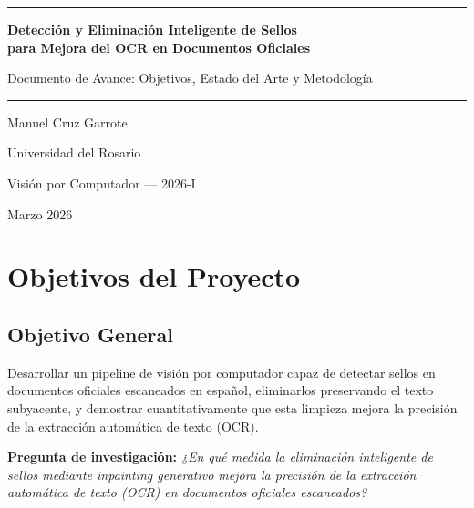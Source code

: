 \documentclass[11pt, a4paper]{article}
\begin{document}
\begin{titlepage}
    \centering
    \vspace*{2cm}
    
    {\color{UnipdRed}\rule{\textwidth}{2pt}}
    \vspace{0.8cm}
    
    {\LARGE\bfseries Detección y Eliminación Inteligente de Sellos\\para Mejora del OCR en Documentos Oficiales}
    
    \vspace{0.5cm}
    {\large\color{DarkGray} Documento de Avance: Objetivos, Estado del Arte y Metodología}
    
    \vspace{0.4cm}
    {\color{UnipdRed}\rule{\textwidth}{2pt}}
    
    \vspace{1.5cm}
    
    {\Large Manuel Cruz Garrote}
    
    \vspace{0.3cm}
    {\large Universidad del Rosario}
    
    \vspace{0.3cm}
    {\large Visión por Computador — 2026-I}
    
    \vfill
    {\large Marzo 2026}
\end{titlepage}

\section{Objetivos del Proyecto}

\subsection{Objetivo General}

Desarrollar un pipeline de visión por computador capaz de detectar sellos en documentos oficiales escaneados en español, eliminarlos preservando el texto subyacente, y demostrar cuantitativamente que esta limpieza mejora la precisión de la extracción automática de texto (OCR).

\textbf{Pregunta de investigación:} \textit{¿En qué medida la eliminación inteligente de sellos mediante inpainting generativo mejora la precisión de la extracción automática de texto (OCR) en documentos oficiales escaneados?}
\end{document}
